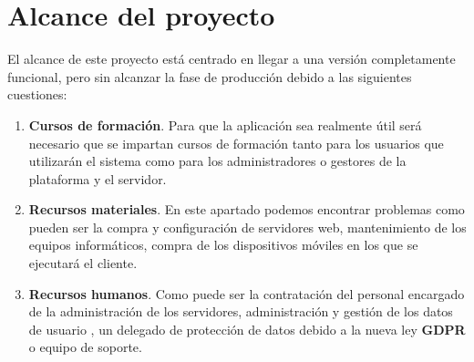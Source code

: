 \section{Alcance del proyecto}

El alcance de este proyecto está centrado en llegar a una versión completamente funcional,
pero sin alcanzar la fase de producción debido a las siguientes cuestiones:

\begin{enumerate}
    \item \textbf{Cursos de formación}. Para que la aplicación sea realmente útil será necesario
    que se impartan cursos de formación tanto para los usuarios que utilizarán el sistema
    como para los administradores o gestores de la plataforma y el servidor.

    \item \textbf{Recursos materiales}. En este apartado podemos encontrar problemas como pueden
    ser la compra y configuración de servidores web, mantenimiento de los equipos informáticos, 
    compra de los dispositivos móviles en los que se ejecutará el cliente.
    
    \item \textbf{Recursos humanos}. Como puede ser la contratación del personal encargado
    de la administración de los servidores, administración y gestión de los datos de usuario , un delegado de protección de datos debido a la nueva ley \textbf{GDPR} o equipo de soporte.

\end{enumerate}

